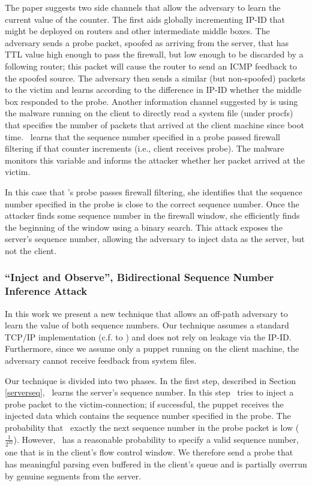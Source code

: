 \documentclass[conference]{IEEEtran}
\begin{document}
The paper suggests two side channels that allow the adversary to learn the current value of the counter. The first aids globally incrementing IP-ID that might be deployed on routers and other intermediate middle boxes. The adversary sends a probe packet, spoofed as arriving from the server, that has TTL value high enough to pass the firewall, but low enough to be discarded by a following router; this packet will cause the router to send an ICMP feedback to the spoofed source. The adversary then sends a similar (but non-spoofed) packets to the victim and learns according to the difference in IP-ID whether the middle box responded to the probe.
Another information channel suggested by \cite{snptcp} is using the malware running on the client to directly read a system file (under procfs) that specifies the number of packets that arrived at the client machine since boot time. \mal\ learns that the sequence number specified in a probe passed firewall filtering if that counter increments (i.e., client receives probe). The malware monitors this variable and informs the attacker whether her packet arrived at the victim.

In this case that \mal's probe passes firewall filtering, she identifies that the sequence number specified in the probe is close to the correct sequence number. Once the attacker finds some sequence number in the firewall window, she efficiently finds the beginning of the window using a binary search. This attack exposes the server's sequence number, allowing the adversary to inject data as the server, but not the client.

\subsubsection{``Inject and Observe'', Bidirectional Sequence Number Inference Attack} \label{injectandobservehigh}

In this work we present a new technique that allows an off-path adversary to learn the value of both sequence numbers. Our technique assumes a standard TCP/IP implementation (c.f. to \cite{woottcp}) and does not rely on leakage via the IP-ID. Furthermore, since we assume only a puppet running on the client machine, the adversary cannot receive feedback from system files. 

Our technique is divided into two phases. In the first step, described in Section \ref{serverseq}, \mal\ learns the server's sequence number. 
In this step \mal\ tries to inject a probe packet to the victim-connection; if successful, the puppet receives the injected data which contains the sequence number specified in the probe. The probability that \mal\ exactly the next sequence number in the probe packet is low ($\frac{1}{2^{32}}$). However, \mal\ has a reasonable probability to specify a valid sequence number, one that is in the client's flow control window. We therefore send a probe that has meaningful parsing even buffered in the client's queue and is partially overrun by genuine segments from the server.
\end{document}

